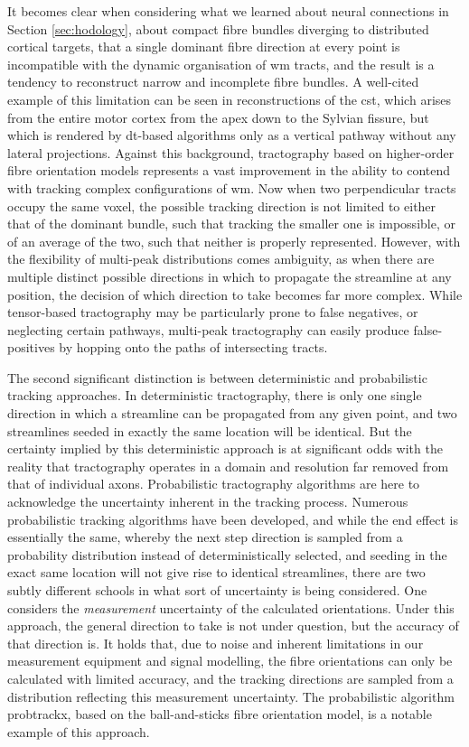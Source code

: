 It becomes clear when considering what we learned about neural connections in Section \ref{sec:hodology}, about compact fibre bundles diverging to distributed cortical targets, that a single dominant fibre direction at every point is incompatible with the dynamic organisation of \gls{wm} tracts, and the result is a tendency to reconstruct narrow and incomplete fibre bundles\autocite{Farquharson2013}.
A well-cited example of this limitation can be seen in reconstructions of the \gls{cst}, which arises from the entire motor cortex from the apex down to the Sylvian fissure, but which is rendered by \gls{dt}-based algorithms only as a vertical pathway without any lateral projections.
Against this background, tractography based on higher-order fibre orientation models represents a vast improvement in the ability to contend with tracking complex configurations of \gls{wm}.
Now when two perpendicular tracts occupy the same voxel, the possible tracking direction is not limited to either that of the dominant bundle, such that tracking the smaller one is impossible, or of an average of the two, such that neither is properly represented.
However, with the flexibility of multi-peak distributions comes ambiguity, as when there are multiple distinct possible directions in which to propagate the streamline at any position, the decision of which direction to take becomes far more complex.
While tensor-based tractography may be particularly prone to false negatives, or neglecting certain pathways, multi-peak tractography can easily produce false-positives by hopping onto the paths of intersecting tracts.

The second significant distinction is between deterministic and probabilistic tracking approaches.
In deterministic tractography, there is only one single direction in which a streamline can be propagated from any given point, and two streamlines seeded in exactly the same location will be identical.
But the certainty implied by this deterministic approach is at significant odds with the reality that tractography operates in a domain and resolution far removed from that of individual axons.
Probabilistic tractography algorithms are here to acknowledge the uncertainty inherent in the tracking process.
Numerous probabilistic tracking algorithms have been developed, and while the end effect is essentially the same, whereby the next step direction is sampled from a probability distribution instead of deterministically selected, and seeding in the exact same location will not give rise to identical streamlines, there are two subtly different schools in what sort of uncertainty is being considered\autocite{Jeurissen2019}.
One considers the \textit{measurement} uncertainty of the calculated orientations.
Under this approach, the general direction to take is not under question, but the accuracy of that direction is.
It holds that, due to noise and inherent limitations in our measurement equipment and signal modelling, the fibre orientations can only be calculated with limited accuracy, and the tracking directions are sampled from a distribution reflecting this measurement uncertainty.
The probabilistic algorithm probtrackx\autocite{Behrens2007}, based on the ball-and-sticks fibre orientation model\autocite{Behrens2003}, is a notable example of this approach.

